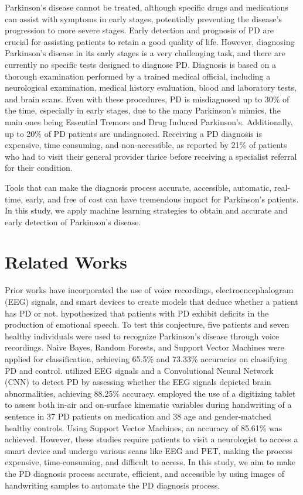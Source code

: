 \documentclass[pmlr,twocolumn,10pt]{jmlr} %
\begin{document}
Parkinson’s disease cannot be treated, although specific drugs and medications can assist with symptoms in early stages, potentially preventing the disease’s progression to more severe stages. Early detection and prognosis of PD are crucial for assisting patients to retain a good quality of life. However, diagnosing Parkinson’s disease in its early stages is a very challenging task, and there are currently no specific tests designed to diagnose PD. Diagnosis is based on a thorough examination performed by a trained medical official, including a neurological examination, medical history evaluation, blood and laboratory tests, and brain scans. Even with these procedures, PD is misdiagnosed up to 30\% of the time, especially in early stages, due to the many Parkinson’s mimics, the main ones being Essential Tremors and Drug Induced Parkinson’s. Additionally, up to 20\% of PD patients are undiagnosed. Receiving a PD diagnosis is expensive, time consuming, and non-accessible, as reported by 21\% of patients who had to visit their general provider thrice before receiving a specialist referral for their condition. 

Tools that can make the diagnosis process accurate, accessible, automatic, real-time, early, and free of cost can have tremendous impact for Parkinson’s patients. In this study, we apply machine learning strategies to obtain and accurate and early detection of Parkinson's disease. 

\section{Related Works}
\label{related-works}
Prior works have incorporated the use of voice recordings, electroencephalogram (EEG) signals, and smart devices to create models that deduce whether a patient has PD or not. \citep{zhao2014automatic} hypothesized that patients with PD exhibit deficits in the production of emotional speech. To test this conjecture, five patients and seven healthy individuals were used to recognize Parkinson’s disease through voice recordings. Naive Bayes, Random Forests, and Support Vector Machines were applied for classification, achieving 65.5\% and 73.33\% accuracies on classifying PD and control. \citep{oh2020deep} utilized EEG signals and a Convolutional Neural Network (CNN) to detect PD
by assessing whether the EEG signals depicted brain abnormalities, achieving 88.25\% accuracy. \citep{drotar2014analysis} employed the use of a digitizing tablet to assess both in-air and on-surface kinematic variables during handwriting of a sentence in 37 PD patients on medication and 38 age and gender-matched healthy controls. Using Support Vector Machines, an accuracy of 85.61\% was achieved. However, these studies require patients to visit a neurologist to access a smart device and undergo various scans like EEG and PET, making the process expensive, time-consuming, and difficult to access. In this study, we aim to make the PD diagnosis process accurate, efficient, and accessible by using images of handwriting samples to automate the PD diagnosis process. 
\end{document}
